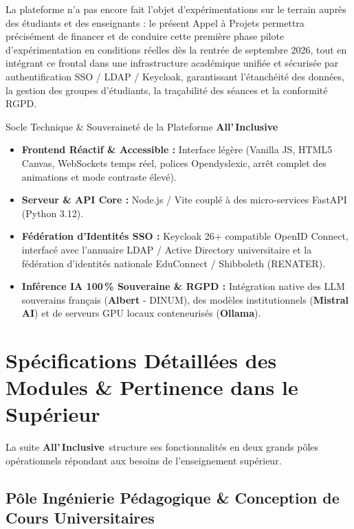 \documentclass[11pt,a4paper]{article}
\newcommand{\AIBrand}{\textbf{\textcolor{primaryRed}{A}ll'\,\textcolor{primaryRed}{I}nclusive}}
\begin{document}
La plateforme n'a pas encore fait l'objet d'expérimentations sur le terrain auprès des étudiants et des enseignants : le présent Appel à Projets permettra précisément de financer et de conduire cette première phase pilote d'expérimentation en conditions réelles dès la rentrée de septembre 2026, tout en intégrant ce frontal dans une infrastructure académique unifiée et sécurisée par authentification SSO / LDAP / Keycloak, garantissant l'étanchéité des données, la gestion des groupes d'étudiants, la traçabilité des séances et la conformité RGPD.

\begin{calloutBox}[univBlue]{Socle Technique \& Souveraineté de la Plateforme \AIBrand}
\begin{itemize}[leftmargin=1.2em, itemsep=2pt]
    \item \textbf{Frontend Réactif \& Accessible :} Interface légère (Vanilla JS, HTML5 Canvas, WebSockets temps réel, polices Opendyslexic, arrêt complet des animations et mode contraste élevé).
    \item \textbf{Serveur \& API Core :} Node.js / Vite couplé à des micro-services FastAPI (Python 3.12).
    \item \textbf{Fédération d'Identités SSO :} Keycloak 26+ compatible OpenID Connect, interfacé avec l'annuaire LDAP / Active Directory universitaire et la fédération d'identités nationale EduConnect / Shibboleth (RENATER).
    \item \textbf{Inférence IA 100\,\% Souveraine \& RGPD :} Intégration native des LLM souverains français (\textbf{Albert} - DINUM), des modèles institutionnels (\textbf{Mistral AI}) et de serveurs GPU locaux conteneurisés (\textbf{Ollama}).
\end{itemize}
\end{calloutBox}

\newpage
\section{Spécifications Détaillées des Modules \& Pertinence dans le Supérieur}

La suite \AIBrand\ structure ses fonctionnalités en deux grands pôles opérationnels répondant aux besoins de l'enseignement supérieur.

\subsection{Pôle Ingénierie Pédagogique \& Conception de Cours Universitaires}
\end{document}
